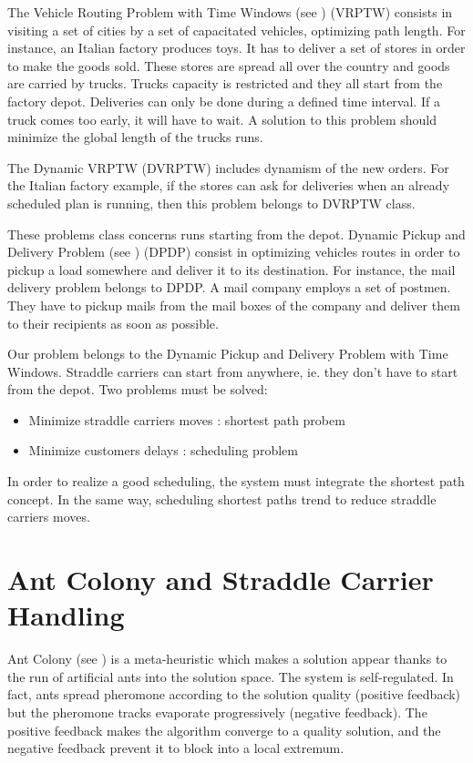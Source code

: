 \documentclass[a4paper,10pt]{article}
\begin{document}
\begin{multicols}{2}
		The Vehicle Routing Problem with Time Windows (see \cite{Bianchi00}) (VRPTW) consists in visiting a set of cities by a set of capacitated vehicles, optimizing path length. For instance, an Italian factory produces toys. It has to deliver a set of stores in order to make the goods sold. These stores are spread all over the country and goods are carried by trucks. Trucks capacity is restricted and they all start from the factory depot. Deliveries can only be done during a defined time interval. If a truck comes too early, it will have to wait. A solution to this problem should minimize the global length of the trucks runs.
		
		The Dynamic VRPTW (DVRPTW) includes dynamism of the new orders. For the Italian factory example, if the stores can ask for deliveries when an already scheduled plan is running, then this problem belongs to DVRPTW class.

		These problems class concerns runs starting from the depot. Dynamic Pickup and Delivery Problem (see \cite{Mitrovic01,Mitrovic04,Mitrovic98}) (DPDP) consist in optimizing vehicles routes in order to pickup a load somewhere and deliver it to its destination. For instance, the mail delivery problem belongs to DPDP. A mail company employs a set of postmen. They have to pickup mails from the mail boxes of the company and deliver them to their recipients as soon as possible.

		Our problem belongs to the Dynamic Pickup and Delivery Problem with Time Windows. Straddle carriers can start from anywhere, ie. they don't have to start from the depot. Two problems must be solved:
		\begin{itemize}
 			\item Minimize straddle carriers moves : shortest path probem
			\item Minimize customers delays : scheduling problem
		\end{itemize} 
		In order to realize a good scheduling, the system must integrate the shortest path concept. In the same way, scheduling shortest paths trend to reduce straddle carriers moves.

	\section*{Ant Colony and Straddle Carrier Handling}
		Ant Colony (see \cite{Dorigo91,Dorigo97}) is a meta-heuristic which makes a solution appear thanks to the run of artificial ants into the solution space. The system is self-regulated. In fact, ants spread pheromone according to the solution quality (positive feedback) but the pheromone tracks evaporate progressively (negative feedback). The positive feedback makes the algorithm converge to a quality solution, and the negative feedback prevent it to block into a local extremum.


\end{multicols}
\end{document}
